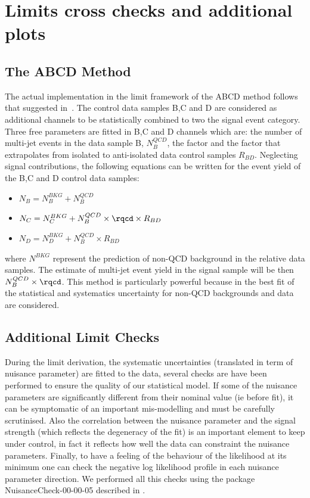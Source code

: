 \clearpage

\chapter{Limits cross checks and additional plots}
\label{appendix:limit}

\section{The ABCD Method }
The actual implementation in the limit framework of the ABCD method follows that suggested in~\cite{ABCD}.
The control data samples B,C and D are considered as additional channels to be statistically combined
to two the signal event category. Three free parameters are fitted in B,C and D channels which are: the 
number of multi-jet events in the data sample B, $N_{B}^{QCD}$, the factor \rqcd 
and the factor that extrapolates from isolated to anti-isolated data control samples $R_{BD}$. Neglecting signal contributions, 
the following equations can be written for the event yield of the B,C and D control data samples:
\begin{itemize}
\item[] $N_{B} = N_{B}^{BKG} + N_{B}^{QCD}$
\item[] $N_{C} = N_{C}^{BKG} +  N_{B}^{QCD} \times \rqcd \times R_{BD} $
\item[] $N_{D} =  N_{D}^{BKG} + N_{B}^{QCD} \times  R_{BD} $
\end{itemize}
where $N^{BKG}$ represent the prediction of  non-QCD background in the relative data samples.
The estimate of multi-jet event yield in the signal sample will be then $ N_{B}^{QCD} \times \rqcd $. This method is 
particularly powerful because in the best fit of \rqcd the statistical 
and systematics uncertainty for non-QCD backgrounds and data are considered.

\section{Additional Limit Checks}
During the limit derivation, the systematic uncertainties (translated in term of nuisance parameter) are fitted to the data,
several checks are have been performed to ensure the quality of our statistical model.
If some of the nuisance parameters are significantly different from their nominal value 
(ie before fit), it can be symptomatic of an important mis-modelling and must be carefully scrutinised.
Also the correlation between the nuisance parameter and the signal strength (which reflects the degeneracy of the fit) 
is an important element to keep under control, in fact it reflects how well the data can constraint the nuisance parameters.
Finally, to have a feeling of the behaviour of the likelihood at its minimum one can check 
the negative log likelihood profile in each nuisance parameter direction. 
We performed all this checks using the package NuisanceCheck-00-00-05 described in \cite{NPcheck}.

